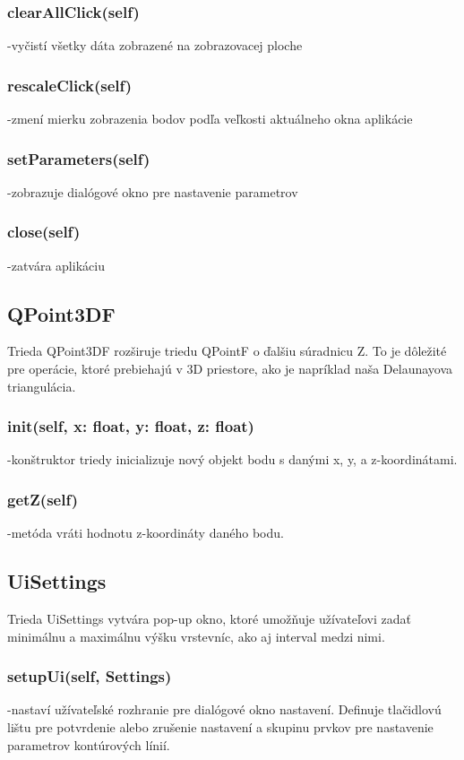 \documentclass[12pt]{article}
\begin{document}
\subsubsection*{clearAllClick(self)}
\noindent-vyčistí všetky dáta zobrazené na zobrazovacej ploche
\subsubsection*{rescaleClick(self)}
\noindent-zmení mierku zobrazenia bodov podľa veľkosti aktuálneho okna aplikácie
\subsubsection*{setParameters(self)}
\noindent-zobrazuje dialógové okno pre nastavenie parametrov
\subsubsection*{close(self)}
\noindent-zatvára aplikáciu

\subsection*{QPoint3DF}
Trieda QPoint3DF rozširuje triedu QPointF o ďalšiu súradnicu Z. To je dôležité pre operácie, ktoré prebiehajú v 3D priestore, ako je napríklad naša Delaunayova triangulácia.
\subsubsection*{\textunderscore \textunderscore init\textunderscore \textunderscore (self, x: float, y: float, z: float)}
\noindent-konštruktor triedy inicializuje nový objekt bodu s danými x, y, a z-koordinátami.

\subsubsection*{getZ(self)}
\noindent-metóda vráti hodnotu z-koordináty daného bodu.
\subsection*{ Ui\textunderscore Settings}
Trieda Ui\textunderscore Settings vytvára pop-up okno, ktoré umožňuje užívateľovi zadať minimálnu a maximálnu výšku vrstevníc, ako aj interval medzi nimi.
\subsubsection*{setupUi(self, Settings)}
\noindent-nastaví užívateľské rozhranie pre dialógové okno nastavení. Definuje tlačidlovú lištu pre potvrdenie alebo zrušenie nastavení a skupinu prvkov pre nastavenie parametrov kontúrových línií.
\end{document}
